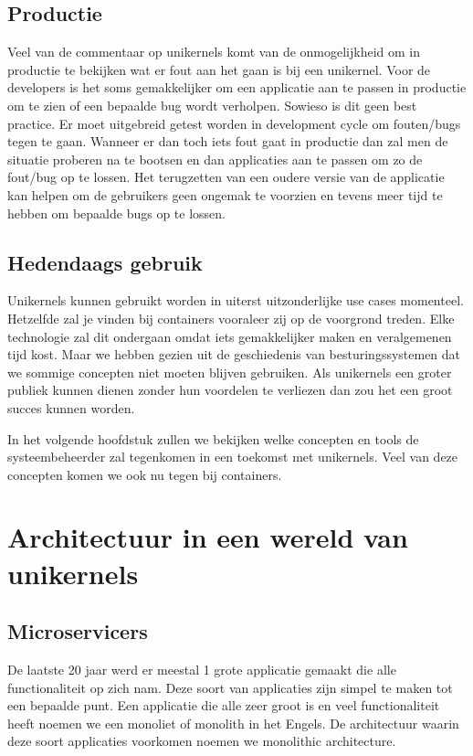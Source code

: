 \documentclass[pdftex,a4paper,12pt,twoside]{report}
\begin{document}
\section{Productie}

Veel van de commentaar op unikernels komt van de onmogelijkheid om in productie te bekijken wat er fout aan het gaan is bij een unikernel. Voor de developers is het soms gemakkelijker om een applicatie aan te passen in productie om te zien of een bepaalde bug wordt verholpen. Sowieso is dit geen best practice. Er moet uitgebreid getest worden in development cycle om fouten/bugs tegen te gaan. Wanneer er dan toch iets fout gaat in productie dan zal men de situatie proberen na te bootsen en dan applicaties aan te passen om zo de fout/bug op te lossen. Het terugzetten van een oudere versie van de applicatie kan helpen om de gebruikers geen ongemak te voorzien en tevens meer tijd te hebben om bepaalde bugs op te lossen.
\section{Hedendaags gebruik}

Unikernels kunnen gebruikt worden in uiterst uitzonderlijke use cases momenteel. Hetzelfde zal je vinden bij containers vooraleer zij op de voorgrond treden. Elke technologie zal dit ondergaan omdat iets gemakkelijker maken en veralgemenen tijd kost. Maar we hebben gezien uit de geschiedenis van besturingssystemen dat we sommige concepten niet moeten blijven gebruiken. Als unikernels een groter publiek kunnen dienen zonder hun voordelen te verliezen dan zou het een groot succes kunnen worden. 

In het volgende hoofdstuk zullen we bekijken welke concepten en tools de systeembeheerder zal tegenkomen in een toekomst met unikernels. Veel van deze concepten komen we ook nu tegen bij containers.

\chapter{Architectuur in een wereld van unikernels}
\section{Microservicers}

De laatste 20 jaar werd er meestal 1 grote applicatie gemaakt die alle functionaliteit op zich nam. Deze soort van applicaties zijn simpel te maken tot een bepaalde punt. Een applicatie die alle zeer groot is en veel functionaliteit heeft noemen we een monoliet of monolith in het Engels. De architectuur waarin deze soort applicaties voorkomen noemen we monolithic architecture. 
\end{document}
